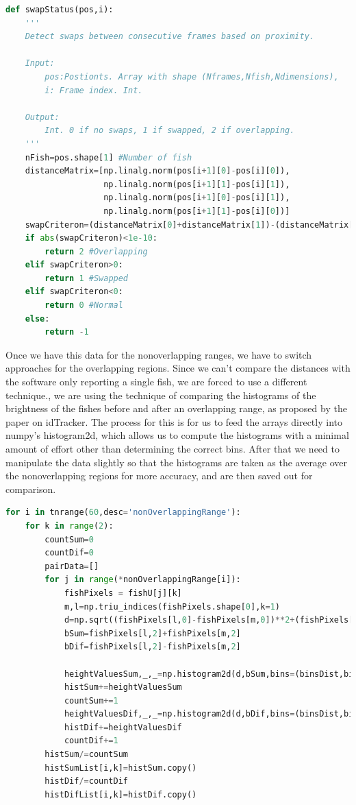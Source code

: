 \documentclass{article}
\begin{document}
\begin{minipage}[c]{\textwidth}
\begin{lstlisting}[language=Python]
def swapStatus(pos,i):
    '''
    Detect swaps between consecutive frames based on proximity.
    
    Input:
        pos:Postionts. Array with shape (Nframes,Nfish,Ndimensions),
        i: Frame index. Int.
    
    Output:
        Int. 0 if no swaps, 1 if swapped, 2 if overlapping.
    '''
    nFish=pos.shape[1] #Number of fish
    distanceMatrix=[np.linalg.norm(pos[i+1][0]-pos[i][0]),
                    np.linalg.norm(pos[i+1][1]-pos[i][1]),
                    np.linalg.norm(pos[i+1][0]-pos[i][1]),
                    np.linalg.norm(pos[i+1][1]-pos[i][0])]
    swapCriteron=(distanceMatrix[0]+distanceMatrix[1])-(distanceMatrix[2]+distanceMatrix[3])
    if abs(swapCriteron)<1e-10:
        return 2 #Overlapping
    elif swapCriteron>0:
        return 1 #Swapped
    elif swapCriteron<0:
        return 0 #Normal
    else:
        return -1
\end{lstlisting}
\end{minipage}

Once we have this data for the nonoverlapping ranges, we have to switch approaches for the overlapping regions. Since we can't compare the distances with the software only reporting a single fish, we are forced to use a different technique., we are using the technique of comparing the histograms of the brightness of the fishes before and after an overlapping range, as proposed by the paper on idTracker\cite{idTracker}. The process for this is for us to feed the arrays directly into numpy's histogram2d, which allows us to compute the histograms with a minimal amount of effort other than determining the correct bins. After that we need to manipulate the data slightly so that the histograms are taken as the average over the nonoverlapping regions for more accuracy, and are then saved out for comparison.

\begin{minipage}[c]{\textwidth}
\begin{lstlisting}[language=Python]
for i in tnrange(60,desc='nonOverlappingRange'):
    for k in range(2):
        countSum=0
        countDif=0
        pairData=[]
        for j in range(*nonOverlappingRange[i]):
            fishPixels = fishU[j][k]
            m,l=np.triu_indices(fishPixels.shape[0],k=1)
            d=np.sqrt((fishPixels[l,0]-fishPixels[m,0])**2+(fishPixels[l,1]-fishPixels[m,1])**2)
            bSum=fishPixels[l,2]+fishPixels[m,2]
            bDif=fishPixels[l,2]-fishPixels[m,2]

            heightValuesSum,_,_=np.histogram2d(d,bSum,bins=(binsDist,binsSum))
            histSum+=heightValuesSum
            countSum+=1
            heightValuesDif,_,_=np.histogram2d(d,bDif,bins=(binsDist,binsDif))
            histDif+=heightValuesDif
            countDif+=1
        histSum/=countSum
        histSumList[i,k]=histSum.copy()
        histDif/=countDif
        histDifList[i,k]=histDif.copy()
\end{lstlisting}
\end{minipage}
\end{document}
